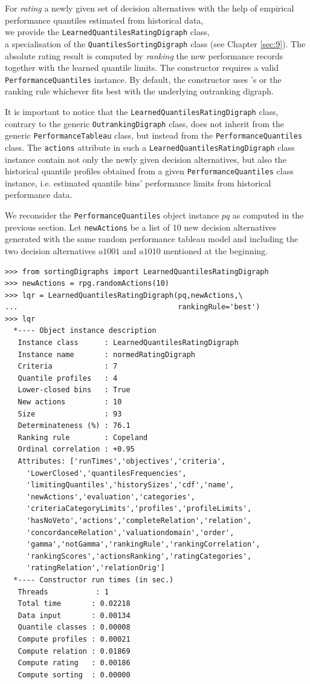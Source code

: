 For \emph{rating} a newly given set of decision alternatives with the help of empirical performance quantiles estimated from historical data,\\we provide the \texttt{LearnedQuantilesRatingDigraph} class,\\ a specialisation of the \texttt{QuantilesSortingDigraph} class (see Chapter \ref{sec:9}). The absolute rating result is computed by \emph{ranking} the new performance records together with the learned quantile limits. The constructor requires a valid \texttt{PerformanceQuantiles} instance. By default, the constructor uses \Copeland 's or the \NetFlows ranking rule whichever fits best with the underlying outranking digraph.

It is important to notice that the \texttt{LearnedQuantilesRatingDigraph} class, contrary to the generic \texttt{OutrankingDigraph} class, does not inherit from the generic \texttt{PerformanceTableau} class, but instead from the \texttt{PerformanceQuantiles} class. The \texttt{actions} attribute in such a \texttt{LearnedQuantilesRatingDigraph} class instance contain not only the newly given decision alternatives, but also the historical quantile profiles obtained from a given \texttt{PerformanceQuantiles} class instance, i.e. estimated quantile bins' performance limits from historical performance data.

We reconsider the \texttt{PerformanceQuantiles} object instance $pq$ as computed in the previous section. Let \texttt{newActions} be a list of 10 new decision alternatives generated with the same random performance tableau model and including the two decision alternatives $a1001$ and $a1010$ mentioned at the beginning.
\begin{lstlisting}[caption={Computing the absolute rating of 10 new decision alternatives},label=list:10.4]
>>> from sortingDigraphs import LearnedQuantilesRatingDigraph
>>> newActions = rpg.randomActions(10)
>>> lqr = LearnedQuantilesRatingDigraph(pq,newActions,\
...                                     rankingRule='best')
>>> lqr
  *---- Object instance description
   Instance class      : LearnedQuantilesRatingDigraph
   Instance name       : normedRatingDigraph
   Criteria            : 7
   Quantile profiles   : 4
   Lower-closed bins   : True
   New actions         : 10
   Size                : 93
   Determinateness (%) : 76.1
   Ranking rule        : Copeland
   Ordinal correlation : +0.95
   Attributes: ['runTimes','objectives','criteria',
     'LowerClosed','quantilesFrequencies',
     'limitingQuantiles','historySizes','cdf','name',
     'newActions','evaluation','categories',
     'criteriaCategoryLimits','profiles','profileLimits',
     'hasNoVeto','actions','completeRelation','relation',
     'concordanceRelation','valuationdomain','order',
     'gamma','notGamma','rankingRule','rankingCorrelation',
     'rankingScores','actionsRanking','ratingCategories',
     'ratingRelation','relationOrig']
  *---- Constructor run times (in sec.)
   Threads           : 1
   Total time       : 0.02218
   Data input       : 0.00134
   Quantile classes : 0.00008
   Compute profiles : 0.00021
   Compute relation : 0.01869
   Compute rating   : 0.00186
   Compute sorting  : 0.00000
\end{lstlisting}

